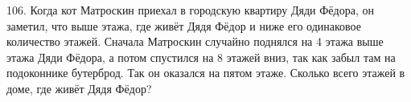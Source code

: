 106. Когда кот Матроскин приехал в городскую квартиру Дяди Фёдора, он заметил, что выше этажа, где живёт Дядя Фёдор и ниже его одинаковое количество этажей. Сначала Матроскин случайно поднялся на 4 этажа выше этажа Дяди Фёдора, а потом спустился на 8 этажей вниз, так как забыл там на подоконнике бутерброд. Так он оказался на пятом этаже. Сколько всего этажей в доме, где живёт Дядя Фёдор?\\
